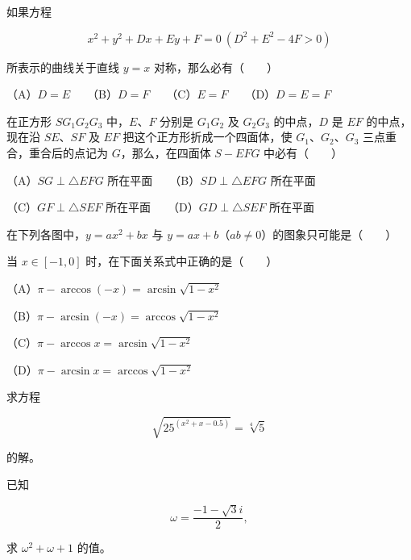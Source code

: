 \begin{question}
如果方程

\nopagebreak[4]
\[
x^2+y^2+Dx+Ey+F=0\ (D^2+E^2-4F>0)
\]

所表示的曲线关于直线 $y=x$ 对称，那么必有\mbox{（　　）}

（A）$D=E$　　（B）$D=F$　　（C）$E=F$　　（D）$D=E=F$

\Needspace{0.4\textheight}
\end{question}
\begin{question}
在正方形 $SG_1G_2G_3$ 中，$E\text{、}F$ 分别是 $G_1G_2$ 及 $G_2G_3$ 的中点，$D$ 是 $EF$ 的中点，现在沿 $SE\text{、}SF$ 及 $EF$ 把这个正方形折成一个四面体，使 $G_1\text{、}G_2\text{、}G_3$ 三点重合，重合后的点记为 $G$，那么，在四面体 $S-EFG$ 中必有\mbox{（　　）}
\nopagebreak[4]
\begin{center}\end{center}
\nopagebreak[4]
（A）$SG\perp\triangle EFG$ 所在平面　　（B）$SD\perp\triangle EFG$ 所在平面

（C）$GF\perp\triangle SEF$ 所在平面　　（D）$GD\perp\triangle SEF$ 所在平面

\Needspace{0.4\textheight}
\end{question}
\begin{question}
在下列各图中，$y=ax^2+bx$ 与 $y=ax+b$（$ab\ne0$）的图象只可能是\mbox{（　　）}
\nopagebreak[4]
\begin{center}\end{center}
\nopagebreak[4]
\end{question}
\begin{question}
当 $x\in[-1,0]$ 时，在下面关系式中正确的是\mbox{（　　）}

（A）$\pi-\arccos(-x)=\arcsin\sqrt{1-x^2}$

（B）$\pi-\arcsin(-x)=\arccos\sqrt{1-x^2}$

（C）$\pi-\arccos x=\arcsin\sqrt{1-x^2}$

（D）$\pi-\arcsin x=\arccos\sqrt{1-x^2}$

\end{question}
\begin{question}
求方程

\nopagebreak[4]
\[
\sqrt{25^{(x^2+x-0.5)}}=\sqrt[4]{5}
\]

的解。

\end{question}
\begin{question}
已知

\nopagebreak[4]
\[
\omega=\frac{-1-\sqrt3i}{2},
\]

求 $\omega^2+\omega+1$ 的值。

\end{question}
